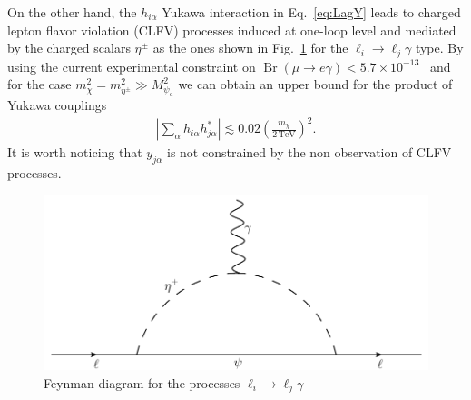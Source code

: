 \documentclass[12pt]{article}
\begin{document}
On the other hand, the $h_{i\alpha}$ Yukawa interaction in Eq.~\eqref{eq:LagY} leads to charged lepton flavor violation (CLFV) processes induced at one-loop level and mediated by the charged scalars $\eta^{\pm}$ as the ones shown in Fig.~\ref{fig:LFV} for the $\ell_i\to\ell_j\gamma$ type. 
By using the current experimental constraint on $\operatorname{Br}(\mu \to e\gamma)<5.7 \times 10^{-13} $~\cite{Adam:2013mnn} and for the case $m_\chi^2=m_{\eta^{\pm}}^{2} \gg M_{\psi_{a}}^{2}$
 we can obtain an upper bound for the product of Yukawa couplings
\begin{align}
    \left| \sum_{\alpha}h_{i \alpha} h_{j\alpha}^{*} \right| \lesssim 0.02 \left(\frac{m_\chi}{2\,\text{TeV}} \right)^{2}.
\end{align}
It is worth noticing that $y_{j\alpha}$ is not constrained by the non observation of CLFV processes. 

%
\begin{figure}[t]
\centering
\includegraphics[scale=0.6]{LFV.pdf}
\caption{Feynman diagram for the processes $\ell_{i} \to \ell_{j} \gamma$}
\label{fig:LFV}
\end{figure}
%


%

%
%
%
%
%
%
\end{document}
